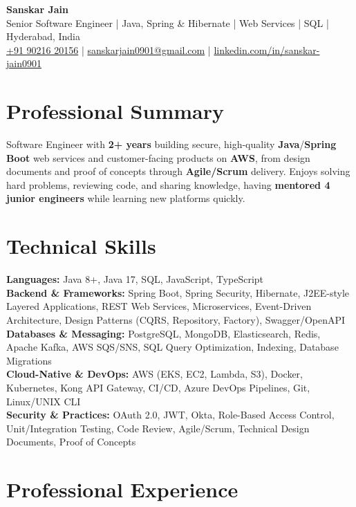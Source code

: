 \documentclass[a4paper,10pt]{article}
\begin{document}
\begin{center}
    {\LARGE \textbf{Sanskar Jain}} \\
    \vspace{2pt}
    Senior Software Engineer \;|\; Java, Spring \& Hibernate \;|\; Web Services \;|\; SQL \;|\; Hyderabad, India \\
    \href{tel:+919021620156}{+91 90216 20156} \;|\;
    \href{mailto:sanskarjain0901@gmail.com}{sanskarjain0901@gmail.com} \;|\;
    \href{https://www.linkedin.com/in/sanskar-jain0901/}{linkedin.com/in/sanskar-jain0901}
\end{center}

\section*{Professional Summary}
Software Engineer with \textbf{2+ years} building secure, high-quality \textbf{Java}/\textbf{Spring Boot} web services and customer-facing products on \textbf{AWS}, from design documents and proof of concepts through \textbf{Agile/Scrum} delivery.
Enjoys solving hard problems, reviewing code, and sharing knowledge, having \textbf{mentored 4 junior engineers} while learning new platforms quickly.

\section*{Technical Skills}
\begin{sloppypar}
\noindent
\textbf{Languages:} Java 8+, Java 17, SQL, JavaScript, TypeScript \\
\textbf{Backend \& Frameworks:} Spring Boot, Spring Security, Hibernate, J2EE-style Layered Applications, REST Web Services, Microservices, Event-Driven Architecture, Design Patterns (CQRS, Repository, Factory), Swagger/OpenAPI \\
\textbf{Databases \& Messaging:} PostgreSQL, MongoDB, Elasticsearch, Redis, Apache Kafka, AWS SQS/SNS, SQL Query Optimization, Indexing, Database Migrations \\
\textbf{Cloud-Native \& DevOps:} AWS (EKS, EC2, Lambda, S3), Docker, Kubernetes, Kong API Gateway, CI/CD, Azure DevOps Pipelines, Git, Linux/UNIX CLI \\
\textbf{Security \& Practices:} OAuth 2.0, JWT, Okta, Role-Based Access Control, Unit/Integration Testing, Code Review, Agile/Scrum, Technical Design Documents, Proof of Concepts
\end{sloppypar}

\section*{Professional Experience}
\end{document}
